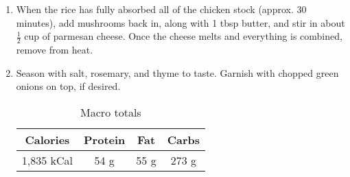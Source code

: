 \begin{multicols}{2}
\begin{enumerate}
\item When the rice has fully absorbed all of the chicken stock (approx. 30 minutes), add mushrooms back in, along with 1 tbsp butter, and stir in about $\frac{1}{2}$ cup of parmesan cheese. Once the cheese melts and everything is combined, remove from heat. 
\item Season with salt, rosemary, and thyme to taste. Garnish with chopped green onions on top, if desired. 


\begin{table}[H]
  \begin{center}
    \caption{Macro totals}
    \label{tab:table1}
    \begin{tabular}{c|c|c|c} %
      \textbf{Calories} & \textbf{Protein} & \textbf{Fat} & \textbf{Carbs}\\
      \hline
      1,835 kCal & 54 g & 55 g & 273 g\\
    \end{tabular}
  \end{center}
\end{table}
 
\end{enumerate}
\end{multicols}
